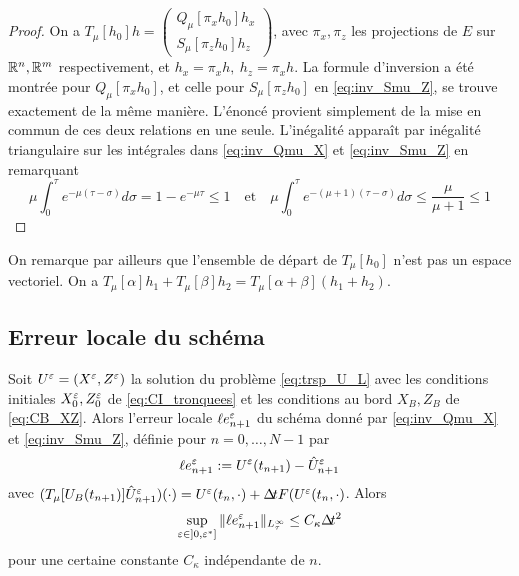 \begin{proof}
On a $T_{\mu}[h_0]h = \begin{pmatrix} Q_{\mu}[\pi_x h_0]h_x \\ S_{\mu}[\pi_z h_0]h_z \end{pmatrix}$, avec $\pi_x,\pi_z$ les projections de $E$ sur $\mathbb{R}^n,\mathbb{R}^m$ respectivement, et $h_x = \pi_x h,\: h_z = \pi_x h$.
La formule d'inversion a été montrée pour $Q_{\mu}[\pi_x h_0]$, et celle pour $S_{\mu}[\pi_z h_0]$ en \eqref{eq:inv_Smu_Z}, se trouve exactement de la même manière. 
L'énoncé provient simplement de la mise en commun de ces deux relations en une seule. 
L'inégalité apparaît par inégalité triangulaire sur les intégrales dans \eqref{eq:inv_Qmu_X} et \eqref{eq:inv_Smu_Z} en remarquant 
$$ \mu\int_0^{\tau} e^{-\mu(\tau-\sigma)}d\sigma = 1-e^{-\mu\tau} \leq 1 \quad\text{et}\quad \mu\int_0^{\tau} e^{-(\mu+1)(\tau-\sigma)}d\sigma \leq \dfrac{\mu}{\mu+1} \leq 1 $$
\end{proof}

On remarque par ailleurs que l'ensemble de départ de $T_{\mu}[h_0]$ n'est pas un espace vectoriel. On a $T_{\mu}[\alpha]h_1 + T_{\mu}[\beta]h_2 = T_{\mu}[\alpha+\beta](h_1+h_2)$. 

\subsection{Erreur locale du schéma}

\begin{theorem} \label{thm:err_loc}
Soit $U^{\varepsilon} = (X^{\varepsilon},Z^{\varepsilon})$ la solution du problème \eqref{eq:trsp_U_L} avec les conditions initiales $X_0^{\varepsilon},Z_0^{\varepsilon}$ de \eqref{eq:CI_tronquees} et les conditions au bord $X_B,Z_B$ de \eqref{eq:CB_XZ}. Alors l'erreur locale $\ell e_{n+1}^{\varepsilon}$ du schéma donné par \eqref{eq:inv_Qmu_X} et \eqref{eq:inv_Smu_Z}, définie pour $n = 0,\ldots,N-1$ par 
$$\ell e_{n+1}^{\varepsilon} := U^{\varepsilon}(t_{n+1}) - \hat{U}_{n+1}^{\varepsilon} $$
avec $(T_{\mu}[U_B(t_{n+1})]\hat{U}_{n+1}^{\varepsilon})(\cdot) = U^{\varepsilon}(t_n,\cdot) + \Delta\!\!\!\ t F(U^{\varepsilon}(t_n,\cdot) $. Alors 
$$ \sup_{\varepsilon\in ]0,\varepsilon^*]} \|\ell e_{n+1}^{\varepsilon}\|_{L^{\infty}_{\tau}} \leq C_{\kappa}\Delta\!\!\!\ t^2 $$
pour une certaine constante $C_{\kappa}$ indépendante de $n$. 
\end{theorem}

